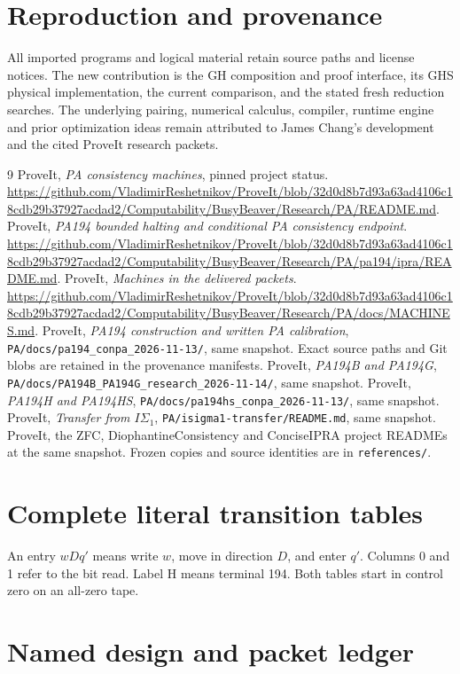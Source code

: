 \documentclass[11pt,letterpaper]{article}
\newcommand{\file}[1]{\texttt{\nolinkurl{#1}}}
\begin{document}
\section{Reproduction and provenance}
\label{sec:reproduce}



All imported programs and logical material retain source paths and license
notices. The new contribution is the GH composition and proof interface,
its GHS physical implementation, the current comparison, and the stated
fresh reduction searches. The underlying pairing, numerical calculus,
compiler, runtime engine and prior optimization ideas remain attributed
to James Chang's development and the cited ProveIt research packets.

\begin{thebibliography}{9}\small
{} ProveIt, \emph{PA consistency machines}, pinned project status.
\url{https://github.com/VladimirReshetnikov/ProveIt/blob/32d0d8b7d93a63ad4106c18cdb29b37927acdad2/Computability/BusyBeaver/Research/PA/README.md}.
 ProveIt, \emph{PA194 bounded halting and conditional PA consistency endpoint}.
\url{https://github.com/VladimirReshetnikov/ProveIt/blob/32d0d8b7d93a63ad4106c18cdb29b37927acdad2/Computability/BusyBeaver/Research/PA/pa194/ipra/README.md}.
 ProveIt, \emph{Machines in the delivered packets}.
\url{https://github.com/VladimirReshetnikov/ProveIt/blob/32d0d8b7d93a63ad4106c18cdb29b37927acdad2/Computability/BusyBeaver/Research/PA/docs/MACHINES.md}.
 ProveIt, \emph{PA194 construction and written PA calibration},
\file{PA/docs/pa194_conpa_2026-11-13/}, same snapshot. Exact source paths and
Git blobs are retained in the provenance manifests.
 ProveIt, \emph{PA194B and PA194G},
\file{PA/docs/PA194B_PA194G_research_2026-11-14/}, same snapshot.
 ProveIt, \emph{PA194H and PA194HS},
\file{PA/docs/pa194hs_conpa_2026-11-13/}, same snapshot.
 ProveIt, \emph{Transfer from $I\Sigma_1$},
\file{PA/isigma1-transfer/README.md}, same snapshot.
 ProveIt, the ZFC, DiophantineConsistency and ConciseIPRA
project READMEs at the same snapshot. Frozen copies and source identities
are in \file{references/}.
\end{thebibliography}

\appendix
\section{Complete literal transition tables}
\label{app:tables}
An entry $wDq'$ means write $w$, move in direction $D$, and enter $q'$.
Columns 0 and 1 refer to the bit read. Label H means terminal 194.
Both tables start in control zero on an all-zero tape.


\section{Named design and packet ledger}
\label{app:ledger}


\end{document}
